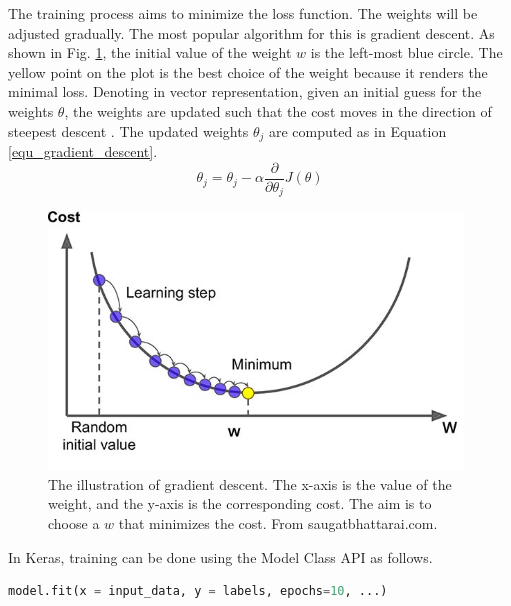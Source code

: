 The training process aims to minimize the loss function. The weights will be adjusted gradually. The most popular algorithm for this is gradient descent. As shown in Fig. \ref{fig_gradient_descent}, the initial value of the weight $w$ is the left-most blue circle. The yellow point on the plot is the best choice of the weight because it renders the minimal loss. Denoting in vector representation, given an initial guess for the weights $\theta$, the weights are updated such that the cost moves in the direction of steepest descent \cite{robbins1951stochastic}. The updated weights $\theta_j$ are computed as in Equation \ref{equ_gradient_descent}.
\begin{equation}
\theta_j=\theta_j - \alpha\frac{\partial}{\partial\theta_j}J(\theta)
 \label{equ_gradient_descent}
\end{equation}

\begin{figure}[h!]
\begin{center}
\includegraphics[width = 11cm]{img/gradient_descent.jpg}
\caption[The illustration of gradient descent]{The illustration of gradient descent. The x-axis is the value of the weight, and the y-axis is the corresponding cost. The aim is to choose a $w$ that minimizes the cost. From saugatbhattarai.com. \label{fig_gradient_descent}}
\end{center}
\end{figure}

In Keras, training can be done using the Model Class API as follows.
\begin{lstlisting}[language=python,frame=single]
model.fit(x = input_data, y = labels, epochs=10, ...)
\end{lstlisting}

